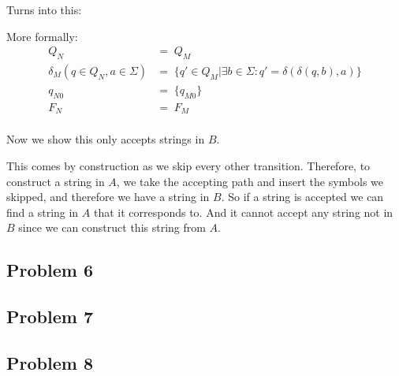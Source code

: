 \documentclass[english]{article}
\begin{document}
Turns into this:


More formally:
\begin{align*}
                              Q_N &=\; Q_M \\
 \delta_M(q \in Q_N,a \in \Sigma) &=\; \{ q' \in Q_M | \exists b \in \Sigma : q' = \delta(\delta(q,b),a) \} \\
                           q_{N0} &=\; \{q_{M0}\} \\
                              F_N &=\; F_M \\
\end{align*}

Now we show this only accepts strings in $B$. 

This comes by construction as we skip every other transition. Therefore, to construct a string in $A$, we take the accepting path and insert the symbols we skipped, and therefore we have a string in $B$. So if a string is accepted we can find a string in $A$ that it corresponds to. And it cannot accept any string not in $B$ since we can construct this string from $A$. 

\subsection*{Problem 6}

\subsection*{Problem 7}

\subsection*{Problem 8}
\end{document}
